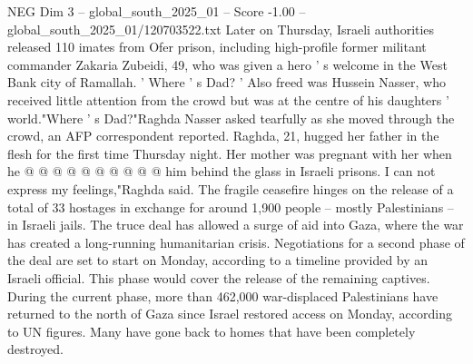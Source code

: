 \begin{textsample}{NEG Dim 3 – global\_south\_2025\_01 – Score -1.00 – global\_south\_2025\_01/120703522.txt}
Later on Thursday, Israeli authorities released 110 imates from Ofer prison, including high-profile former militant commander Zakaria Zubeidi, 49, who was given a hero ' s welcome in the West Bank city of Ramallah. ' Where ' s Dad? ' Also freed was Hussein Nasser, who received little attention from the crowd but was at the centre of his daughters ' world."Where ' s Dad?"Raghda Nasser asked tearfully as she moved through the crowd, an AFP correspondent reported.
Raghda, 21, hugged her father in the flesh for the first time Thursday night.
Her mother was pregnant with her when he @ @ @ @ @ @ @ @ @ @ him behind the glass in Israeli prisons.
I can not express my feelings,"Raghda said.
The fragile ceasefire hinges on the release of a total of 33 hostages in exchange for around 1,900 people -- mostly Palestinians -- in Israeli jails.
The truce deal has allowed a surge of aid into Gaza, where the war has created a long-running humanitarian crisis.
Negotiations for a second phase of the deal are set to start on Monday, according to a timeline provided by an Israeli official.
This phase would cover the release of the remaining captives.
During the current phase, more than 462,000 war-displaced Palestinians have returned to the north of Gaza since Israel restored access on Monday, according to UN figures.
Many have gone back to homes that have been completely destroyed.

\end{textsample}
